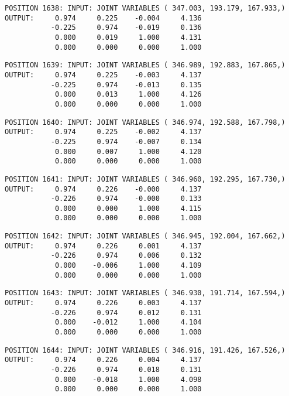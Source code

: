 \begin{verbatim}
POSITION 1638: INPUT: JOINT VARIABLES ( 347.003, 193.179, 167.933,)
OUTPUT:     0.974     0.225    -0.004     4.136
           -0.225     0.974    -0.019     0.136
            0.000     0.019     1.000     4.131
            0.000     0.000     0.000     1.000
\end{verbatim} \pagebreak[1]\begin{verbatim}
POSITION 1639: INPUT: JOINT VARIABLES ( 346.989, 192.883, 167.865,)
OUTPUT:     0.974     0.225    -0.003     4.137
           -0.225     0.974    -0.013     0.135
            0.000     0.013     1.000     4.126
            0.000     0.000     0.000     1.000
\end{verbatim} \pagebreak[1]\begin{verbatim}
POSITION 1640: INPUT: JOINT VARIABLES ( 346.974, 192.588, 167.798,)
OUTPUT:     0.974     0.225    -0.002     4.137
           -0.225     0.974    -0.007     0.134
            0.000     0.007     1.000     4.120
            0.000     0.000     0.000     1.000
\end{verbatim} \pagebreak[1]\begin{verbatim}
POSITION 1641: INPUT: JOINT VARIABLES ( 346.960, 192.295, 167.730,)
OUTPUT:     0.974     0.226    -0.000     4.137
           -0.226     0.974    -0.000     0.133
            0.000     0.000     1.000     4.115
            0.000     0.000     0.000     1.000
\end{verbatim} \pagebreak[1]\begin{verbatim}
POSITION 1642: INPUT: JOINT VARIABLES ( 346.945, 192.004, 167.662,)
OUTPUT:     0.974     0.226     0.001     4.137
           -0.226     0.974     0.006     0.132
            0.000    -0.006     1.000     4.109
            0.000     0.000     0.000     1.000
\end{verbatim} \pagebreak[1]\begin{verbatim}
POSITION 1643: INPUT: JOINT VARIABLES ( 346.930, 191.714, 167.594,)
OUTPUT:     0.974     0.226     0.003     4.137
           -0.226     0.974     0.012     0.131
            0.000    -0.012     1.000     4.104
            0.000     0.000     0.000     1.000
\end{verbatim} \pagebreak[1]\begin{verbatim}
POSITION 1644: INPUT: JOINT VARIABLES ( 346.916, 191.426, 167.526,)
OUTPUT:     0.974     0.226     0.004     4.137
           -0.226     0.974     0.018     0.131
            0.000    -0.018     1.000     4.098
            0.000     0.000     0.000     1.000
\end{verbatim} \pagebreak[1]\begin{verbatim}

\end{verbatim}
